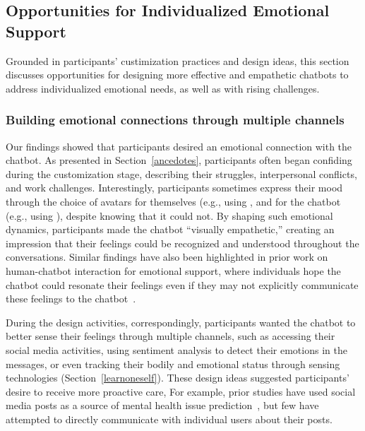 \subsection{Opportunities for Individualized Emotional Support}
Grounded in participants' custimization practices and design ideas, this section discusses opportunities for designing more effective and empathetic chatbots to address individualized emotional needs, as well as with rising challenges.
\vspace{0.2em}
\subsubsection{Building emotional connections through multiple channels}
Our findings showed that participants desired an emotional connection with the chatbot. As presented in Section~\ref{ancedotes}, participants often began confiding during the customization stage, describing their struggles, interpersonal conflicts, and work challenges. 
Interestingly, participants sometimes express their mood through the choice of avatars for themselves (e.g., using  , and for the chatbot  (e.g., using ), despite knowing that it could not.
By shaping such emotional dynamics, participants made the chatbot ``visually empathetic,'' creating an impression that their feelings could be recognized and understood throughout the conversations. Similar findings have also been highlighted in prior work on human-chatbot interaction for emotional support, where individuals hope the chatbot could resonate their feelings even if they may not explicitly communicate these feelings to the chatbot~\cite{meng2021emotional, lee2019caring, chung2023m, li4875898human}. 
 
During the design activities, correspondingly, participants wanted the chatbot to better sense their feelings through multiple channels, such as accessing their social media activities, using sentiment analysis to detect their emotions in the messages, or even tracking their bodily and emotional status through sensing technologies (Section~\ref{learnoneself}). 
These design ideas suggested participants' desire to receive more proactive care, 
For example, prior studies have used social media posts as a source of mental health issue prediction~\cite{Xu2024Predict, chancellor2020methods}, but few have attempted to directly communicate with individual users about their posts. 

